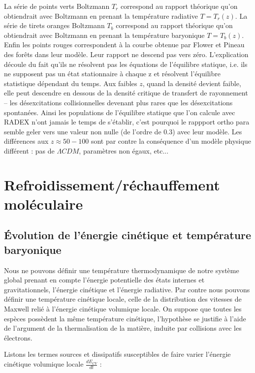 \documentclass[10pt, a4paper]{report}
\numberwithin{equation}{subsection}
\begin{document}
La série de points verts Boltzmann $T_r$ correspond au rapport théorique qu'on obtiendrait avec Boltzmann en prenant la température radiative $T=T_r(z)$.
La série de tirets oranges Boltzmann $T_b$ correspond au rapport théorique qu'on obtiendrait avec Boltzmann en prenant la température baryonique $T=T_b(z)$.
Enfin les points rouges correspondent à la courbe obtenue par Flower et Pineau des forêts dans leur modèle. 
Leur rapport ne descend pas vers zéro. L’explication découle du fait qu’ils ne résolvent pas les équations de l’équilibre statique, i.e. ils ne supposent pas un état stationnaire à chaque z et résolvent l’équilibre statistique dépendant du temps. Aux faibles $z$, quand la densité devient faible, elle peut descendre en dessous de la densité critique de transfert de rayonnement -- les désexcitations collisionnelles devenant plus rares que les désexcitations spontanées. Ainsi les populations de l'équilibre statique que l'on calcule avec RADEX n'ont jamais le temps de s'établir, c'est pourquoi le rappport ortho para semble geler vers une valeur non nulle (de l’ordre de 0.3) avec leur modèle. Les différences aux $z \approx 50 - 100$ sont par contre la conséquence d'un modèle physique différent : pas de $\Lambda CDM$, paramètres non égaux, etc...

\section{Refroidissement/réchauffement moléculaire}
\subsection{\uppercase{é}volution de l'énergie cinétique et température baryonique}
Nous ne pouvons définir une température thermodynamique de notre système global prenant en compte l'énergie potentielle des états internes et gravitationnels, l'énergie cinétique et l'énergie radiative. Par contre nous pouvons définir une température cinétique locale, celle de la distribution des vitesses de Maxwell relié à l'énergie cinétique volumique locale. On suppose que toutes les espèces possèdent la même température cinétique, l'hypothèse se justifie à l'aide de l'argument de la thermalisation de la matière, induite par collisions avec les électrons. 
\bigskip
\large

Listons les termes sources et dissipatifs susceptibles de faire varier l'énergie cinétique volumique locale $\frac{dE_{CV} }{dt}$ :\\
\end{document}
